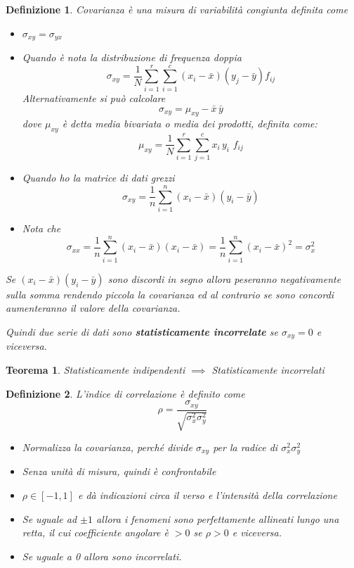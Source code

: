 \documentclass{article}
\newtheorem{definition}{Definizione}[section]
\newtheorem{teorema}{Teorema}[section]
\begin{document}
        \begin{definition}{Covarianza} è una misura di variabilità congiunta definita come 
            \begin{itemize}
               \item $\sigma_{xy} = \sigma_{yx}$
                \item  Quando è nota la distribuzione di frequenza doppia
                $$ \sigma_{xy}  =  \frac{1}{N}\sum_{i=1}^{r}\sum_{i=1}^{c}(x_i-\bar{x})(y_j-\bar{y})f_{ij}$$
                Alternativamente si può calcolare
                $$\sigma_{xy}= \mu_{xy} - \bar{x}\, \bar{y}$$  dove $\mu_{xy}$ è detta media bivariata o media dei prodotti, definita come: 
          $$ \mu_{xy} = \frac{1}{N}\sum_{i=1}^r \sum_{j=1}^c x_i \,y_i \,\,f_{ij}$$
             
             \item Quando ho la matrice di dati grezzi
                 $$ \sigma_{xy} = \frac{1}{n}\sum_{i=1}^{n}(x_i-\bar{x})(y_i-\bar{y})$$
                
            \item Nota che $$\sigma_{xx}                     
                        =\frac{1}{n}\sum_{i=1}^{n}(x_i-\bar{x})(x_i-\bar{x})= \frac{1}{n}\sum_{i=1}^{n}(x_i-\bar{x})^2 = \sigma^2_x$$
                
            \end{itemize}{}
            
          
            Se $(x_i - \bar{x})(y_i -\bar{y})$ sono discordi in segno allora peseranno negativamente sulla somma rendendo piccola la covarianza ed al contrario se sono concordi aumenteranno il valore della covarianza. 
            
            Quindi due serie di dati sono \textbf{statisticamente incorrelate} se $\sigma_{xy}=0$ e viceversa. 
        \end{definition}{}
        
        \begin{teorema}{}
            Statisticamente indipendenti $\implies$ Statisticamente incorrelati
        \end{teorema}

        \begin{definition}{}L'indice di correlazione è definito come 
            $$\rho = \frac{\sigma_{xy}}{\sqrt{\sigma^2_x\sigma^2_y}}$$ 
                \begin{itemize}
                    \item Normalizza la covarianza, perché divide $\sigma_{xy}$ per la radice di $\sigma^2_x \sigma^2_y$
                    \item Senza unità di misura, quindi è confrontabile
                    \item $\rho \in [-1,1]$ e dà indicazioni circa il verso e l'intensità della correlazione
                    \item Se uguale ad $\pm 1$ allora i fenomeni sono perfettamente allineati lungo una retta, il cui coefficiente angolare è $>0$ se $\rho >0$ e viceversa. 
                    \item Se uguale a 0 allora sono incorrelati. 
                \end{itemize}
        \end{definition}
\end{document}
